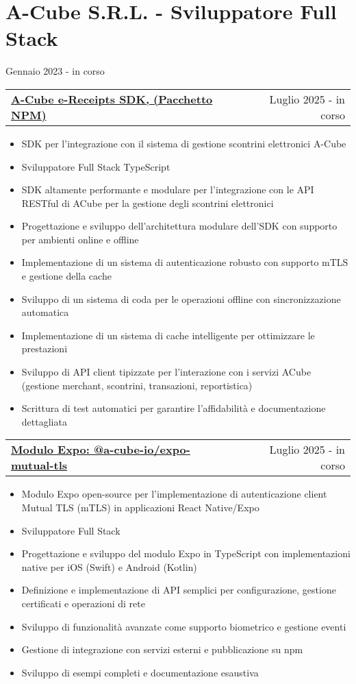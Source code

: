 \documentclass[a4paper,12pt]{article}
\makeatletter
\newenvironment{joblong}[2]
    {
    \begin{tabularx}{\linewidth}{@{}l X r@{}}
    \textbf{#1} & \hfill &  #2 \\[3.75pt]
    \end{tabularx}
    \begin{minipage}[t]{\linewidth}
    \begin{itemize}[nosep,after=\strut, leftmargin=1em, itemsep=3pt,label=--]
    }
    {
    \end{itemize}
    \end{minipage}    
    }
\makeatother
\begin{document}
\section{A-Cube S.R.L. - Sviluppatore Full Stack}
{Gennaio 2023 - in corso}

\begin{joblong}{\href{https://github.com/a-cube-io/ereceipts-js-sdk}{A-Cube e-Receipts SDK, (Pacchetto NPM)}}{Luglio 2025 - in corso}
\item SDK per l'integrazione con il sistema di gestione scontrini elettronici A-Cube
\item Sviluppatore Full Stack TypeScript
\item SDK altamente performante e modulare per l'integrazione con le API RESTful di ACube per la gestione degli scontrini elettronici
\item Progettazione e sviluppo dell'architettura modulare dell'SDK con supporto per ambienti online e offline
\item Implementazione di un sistema di autenticazione robusto con supporto mTLS e gestione della cache
\item Sviluppo di un sistema di coda per le operazioni offline con sincronizzazione automatica
\item Implementazione di un sistema di cache intelligente per ottimizzare le prestazioni
\item Sviluppo di API client tipizzate per l'interazione con i servizi ACube (gestione merchant, scontrini, transazioni, reportistica)
\item Scrittura di test automatici per garantire l'affidabilità e documentazione dettagliata
\end{joblong}

\begin{joblong}{\href{https://www.npmjs.com/package/@a-cube-io/expo-mutual-tls}{Modulo Expo: @a-cube-io/expo-mutual-tls}}{Luglio 2025 - in corso}
\item Modulo Expo open-source per l'implementazione di autenticazione client Mutual TLS (mTLS) in applicazioni React Native/Expo
\item Sviluppatore Full Stack
\item Progettazione e sviluppo del modulo Expo in TypeScript con implementazioni native per iOS (Swift) e Android (Kotlin)
\item Definizione e implementazione di API semplici per configurazione, gestione certificati e operazioni di rete
\item Sviluppo di funzionalità avanzate come supporto biometrico e gestione eventi
\item Gestione di integrazione con servizi esterni e pubblicazione su npm
\item Sviluppo di esempi completi e documentazione esaustiva
\end{joblong}
\end{document}
